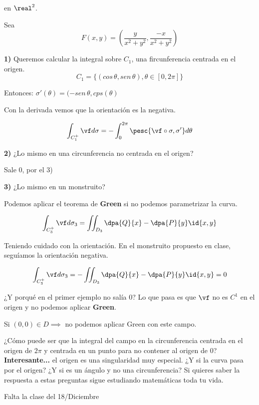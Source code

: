 \begin{example}
en $\real^2$.

Sea \[F(x,y) = \left(\frac{y}{x^2+y^2}, \frac{-x}{x^2+y^2}\right)\]

\textbf{1)}
Queremos calcular la integral sobre $C_1$, una fircunferencia centrada en el origen.
\[C_1 = \{(cos\,\theta,sen\,\theta),\theta\in[0,2\pi]\}\]

Entonces: $\sigma'(\theta) = (-sen\,\theta,cps(\theta)$

Con la derivada vemos que la orientación es la negativa.

\[\int_{C_1^+} \vf d\sigma = -\int_0^{2\pi} \pesc{\vf\circ\sigma,\sigma'}d\theta\]

\textbf{2)}
¿Lo mismo en una circunferencia no centrada en el origen?

Sale $0$, por el 3)

\textbf{3)} 
¿Lo mismo en un monstruito?

Podemos aplicar el teorema de \textbf{Green} si no podemos parametrizar la curva.

\[\int_{C_3^+} \vf d\sigma_3 = \iint_{D_3} \dpa{Q}{x} - \dpa{P}{y} \id{x,y}\]

Teniendo cuidado con la orientación. En el monstruito propuesto en clase, seguíamos la orientación negativa.

\[\int_{C_3^+} \vf d\sigma_3 =  - \iint_{D_3} \dpa{Q}{x} - \dpa{P}{y} \id{x,y} = 0\]


\obs
¿Y porqué en el primer ejemplo no salía 0? Lo que pasa es que $\vf$ no es $C^1$ en el origen y no podemos aplicar \textbf{Green}.

Si $(0,0)\in D \implies $ no podemos aplicar Green con este campo.

¿Cómo puede ser que la integral del campo en la circunferencia centrada en el origen de $2\pi$ y centrada en un punto para no contener al origen de $0$?  \textbf{Interesante...} el origen es una singularidad muy especial. ¿Y si la curva pasa por el origen? ¿Y si es un ángulo y no una circunferencia? Si quieres saber la respuesta a estas preguntas sigue estudiando matemáticas toda tu vida.

\end{example}

Falta la clase del 18/Diciembre

